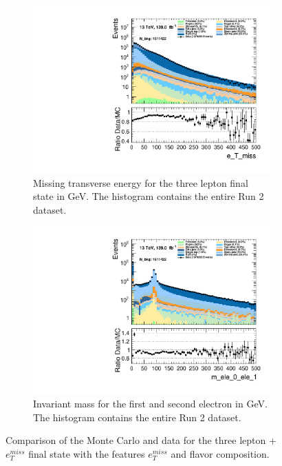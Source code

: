 \begin{figure}[h!]
    \centering
    \begin{subfigure}{.6\textwidth}
        \includegraphics[width=\textwidth]{Figures/MC_Data_comp/lep3/e_T_miss_3lep.pdf}
        \caption{Missing transverse energy for the three lepton final state in GeV. The histogram contains the entire Run 2 dataset.}
        \label{fig:etmiss}
    \end{subfigure}
    \hfill
    \begin{subfigure}{.6\textwidth}
        \includegraphics[width=\textwidth]{Figures/MC_Data_comp/lep3/m_ele_0_ele_1_3lep.pdf}
        \caption{Invariant mass for the first and second electron in GeV. The histogram contains the entire Run 2 dataset. }
        \label{fig:mll_3lep}
    \end{subfigure}
    \hfill        
    \caption[3 lepton + $e_T^{miss}$ Monte Carlo and ATLAS data comparison]{Comparison of the Monte Carlo and data for the three lepton + $e_T^{miss}$ final state with the features $e_{T}^{miss}$ and flavor composition.
    }
    \label{fig:MC_Data_comp}
\end{figure}

